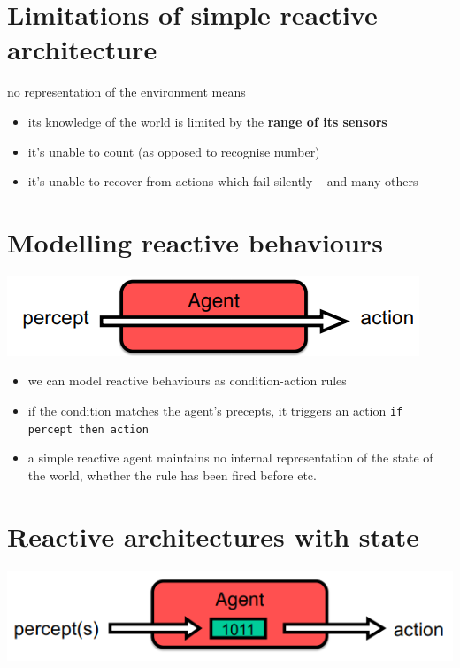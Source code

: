 \documentclass{article}
\begin{document}
\tableofcontents

\newpage

\section{Limitations of simple reactive architecture}
no representation of the environment means
\begin{itemize}
  \item its knowledge of the world is limited by the \textbf{range of its sensors }
  \item it’s unable to count (as opposed to recognise number)
  \item it’s unable to recover from actions which fail silently – and many others
\end{itemize}

\begin{multicols}{2}

\section{Modelling reactive behaviours}
\begin{center}
  \includegraphics[scale=0.5]{reactive_agent.png}
\end{center}

\begin{itemize}
  \item we can model reactive behaviours as condition-action rules 
  \item if the condition matches the agent’s precepts, it triggers an action \texttt{if percept then action }
  \item a simple reactive agent maintains no internal representation of the state of the world, whether the rule has been fired before etc.
\end{itemize}


\section{Reactive architectures with state}

\begin{center}
  \includegraphics[scale=0.5]{reactive_state_agent.png}
\end{center}


\end{multicols}
\end{document}
